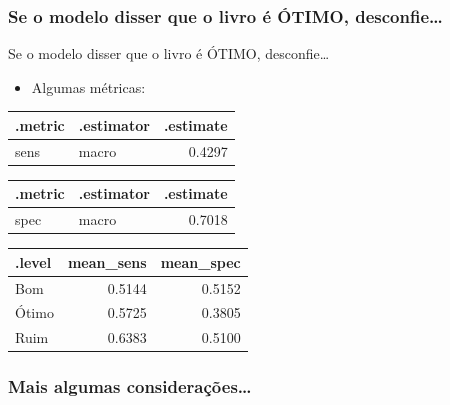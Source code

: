 \documentclass[
  9 pt,
  ignorenonframetext,
]{beamer}
\providecommand{\tightlist}{%
  \setlength{\itemsep}{0pt}\setlength{\parskip}{0pt}}
\begin{document}
\hypertarget{se-o-modelo-disser-que-o-livro-uxe9-uxf3timo-desconfie}{%
\subsubsection{Se o modelo disser que o livro é ÓTIMO,
desconfie\ldots{}}\label{se-o-modelo-disser-que-o-livro-uxe9-uxf3timo-desconfie}}

\begin{frame}{Se o modelo disser que o livro é ÓTIMO, desconfie\ldots{}}
\begin{itemize}
\tightlist
\item
  Algumas métricas:
\end{itemize}

\begin{table}[H]
\centering
\begin{tabular}{llr}
\toprule
.metric & .estimator & .estimate\\
\midrule
sens & macro & 0.4297\\
\bottomrule
\end{tabular}
\end{table}

\begin{table}[H]
\centering
\begin{tabular}{llr}
\toprule
.metric & .estimator & .estimate\\
\midrule
spec & macro & 0.7018\\
\bottomrule
\end{tabular}
\end{table}

\begin{table}[H]
\centering
\begin{tabular}{lrr}
\toprule
.level & mean\_sens & mean\_spec\\
\midrule
Bom & 0.5144 & 0.5152\\
Ótimo & 0.5725 & 0.3805\\
Ruim & 0.6383 & 0.5100\\
\bottomrule
\end{tabular}
\end{table}
\end{frame}

\hypertarget{mais-algumas-considerauxe7uxf5es}{%
\subsubsection{Mais algumas
considerações\ldots{}}\label{mais-algumas-considerauxe7uxf5es}}
\end{document}
